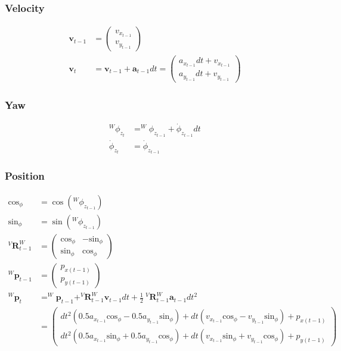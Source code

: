 \documentclass{article}
\newcommand{\Rotation}[3]{^{#1}\textbf{R}^{#2}_{#3}}
\newcommand{\Position}[2]{^{#1}\textbf{p}_{#2}}
\newcommand{\Yaw}[1]{^W\phi_{z_{#1}}}
\begin{document}
\subsubsection{Velocity}
\begin{align}
  \textbf{v}_{t-1} &= \left(\begin{matrix}v_{x_{t-1}}\\v_{y_{t-1}}\end{matrix}\right) \\
  \textbf{v}_t &= \textbf{v}_{t-1} + \textbf{a}_{t-1} dt = 
  \left(\begin{matrix}a_{x_{t-1}} dt + v_{x_{t-1}}\\a_{y_{t-1}} dt + v_{y_{t-1}}\end{matrix}\right)
\end{align}

\subsubsection{Yaw}
\begin{align}
  \Yaw{t} &= \Yaw{t-1} + \dot{\phi}_{z_{t-1}} dt \\
  \dot{\phi}_{z_t} &= \dot{\phi}_{z_{t-1}}
\end{align}

\subsubsection{Position}
\begin{align}
  \textrm{cos}_\phi &= \cos{\left(\Yaw{t-1}\right)} \\
  \textrm{sin}_\phi &= \sin{\left(\Yaw{t-1}\right)} \\
  \Rotation{V}{W}{t-1} &= \left(\begin{matrix}\textrm{cos}_\phi & - \textrm{sin}_\phi\\\textrm{sin}_\phi & \textrm{cos}_\phi\end{matrix}\right) \\
  \Position{W}{t-1} &= \left(\begin{matrix}p_{x (t-1)}\\p_{y (t-1)}\end{matrix}\right) \\
  \Position{W}{t} &= \Position{W}{t-1} + \Rotation{V}{W}{t-1}\textbf{v}_{t-1}dt + \frac{1}{2}\ \Rotation{V}{W}{t-1}\textbf{a}_{t-1}dt^2 \\
  &= \left(\begin{matrix}dt^{2} \left(0.5 a_{x_{t-1}} \textrm{cos}_\phi - 0.5 a_{y_{t-1}} \textrm{sin}_\phi\right) + dt \left(v_{x_{t-1}} \textrm{cos}_\phi - v_{y_{t-1}} \textrm{sin}_\phi\right) + p_{x (t-1)}\\dt^{2} \left(0.5 a_{x_{t-1}} \textrm{sin}_\phi + 0.5 a_{y_{t-1}} \textrm{cos}_\phi\right) + dt \left(v_{x_{t-1}} \textrm{sin}_\phi + v_{y_{t-1}} \textrm{cos}_\phi\right) + p_{y (t-1)}\end{matrix}\right)
\end{align}
\end{document}
